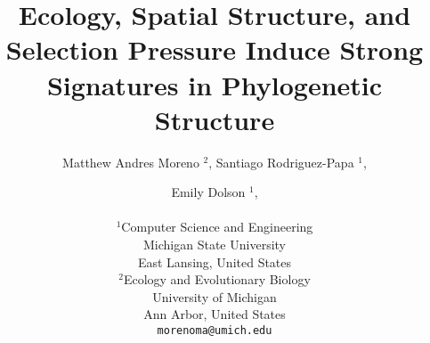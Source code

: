 \title{ Ecology, Spatial Structure, and Selection Pressure Induce Strong Signatures in Phylogenetic Structure }

\author{
Matthew Andres Moreno
$^{2}$,
Santiago Rodriguez-Papa
$^{1}$,
\and Emily Dolson
$^{1}$,
\\
\mbox{}\\
$^1$Computer Science and Engineering \\
Michigan State University \\
East Lansing, United States \\
$^2$Ecology and Evolutionary Biology \\
University of Michigan \\
Ann Arbor, United States \\
\texttt{morenoma@umich.edu}
}

\maketitle
